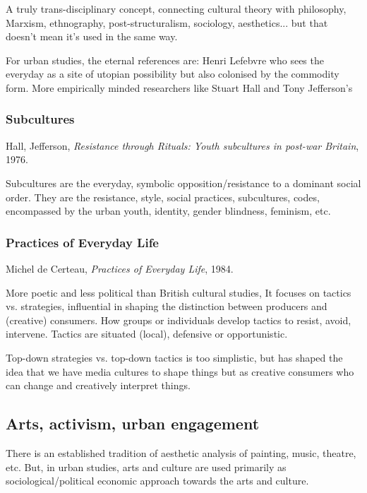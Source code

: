 \documentclass{article}
\begin{document}
A truly trans-disciplinary concept, connecting cultural theory with philosophy, Marxism, ethnography, post-structuralism, sociology, aesthetics... but that doesn't mean it's used in the same way.

For urban studies, the eternal references are: Henri Lefebvre who sees the everyday as a site of utopian possibility but also colonised by the commodity form. More empirically minded researchers like Stuart Hall and Tony Jefferson's 

\subsubsection{Subcultures}

Hall, Jefferson, \textit{Resistance through Rituals: Youth subcultures in post-war Britain}, 1976. 

Subcultures are the everyday, symbolic opposition/resistance to a dominant social order. They are the resistance, style, social practices, subcultures, codes, encompassed by the urban youth, identity, gender blindness, feminism, etc.

\subsubsection{Practices of Everyday Life}

Michel de Certeau, \textit{Practices of Everyday Life}, 1984. 

More poetic and less political than British cultural studies, It focuses on tactics vs. strategies, influential in shaping the distinction between producers and (creative) consumers. How groups or individuals develop tactics to resist, avoid, intervene. Tactics are situated (local), defensive or opportunistic.

Top-down strategies vs. top-down tactics is too simplistic, but has shaped the idea that we have media cultures to shape things but as creative consumers who can change and creatively interpret things.

\subsection{Arts, activism, urban engagement}

There is an established tradition of aesthetic analysis of painting, music, theatre, etc. But, in urban studies, arts and culture are used primarily as sociological/political economic approach towards the arts and culture.
\end{document}
